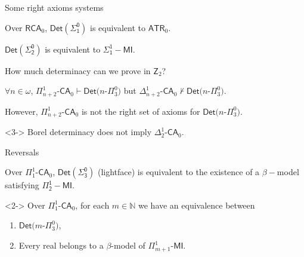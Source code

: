\documentclass{beamer} %
\begin{document}

\begin{frame}{Some right axioms systems}
    \begin{theorem}
        Over $\mathsf{RCA}_0$, $\mathsf{Det(\Sigma_1^0)}$ is equivalent to $\mathsf{ATR}_0$. 
    \end{theorem}

    \begin{theorem}[Tanaka]
        $\mathsf{Det(\Sigma_2^0)}$ is equivalent to $\mathsf{\Sigma_1^1-MI}$.
    \end{theorem}
\end{frame}


\begin{frame}{How much determinacy can we prove in $\mathsf{Z}_2$?} 
    \begin{theorem}
        $\forall n \in \omega$, $\Pi^1_{n+2}$-$\mathsf{CA}_0 \vdash \mathsf{Det}(n$-$\Pi^0_3)$ but
        $\Delta^1_{n+2}$-$\mathsf{CA}_0 \not\vdash \mathsf{Det}(n$-$\Pi^0_3)$.
    \end{theorem}
    \pause
    However, $\Pi^1_{n+2}$-$\mathsf{CA}_0$ is not the right set of axioms for 
    $\mathsf{Det}(n$-$\Pi^0_3)$.

    \begin{theorem}<3->
        Borel determinacy does not imply $\Delta^1_2$-$\mathsf{CA}_0$.
    \end{theorem}
\end{frame}


\begin{frame}{Reversals}
 
    \begin{theorem}[Hachtman]
        Over $\Pi_1^1$-$\mathsf{CA}_0$, $\mathsf{Det(\Sigma_3^0)}$ (lightface) is equivalent to the existence of a $\beta-$model 
        satisfying $\mathsf{\Pi_2^1-MI}$.
    \end{theorem}

    \begin{theorem}<2->
        Over $\Pi_1^1$-$\mathsf{CA}_0$, for each $m\in \mathbb{N}$ we have an 
        equivalence between 
        \begin{enumerate}
            \item $\mathsf{Det}(m$-$\Pi_3^0)$,
            \item Every real belongs to a $\beta$-model of $\Pi_{m+1}^1$-$\mathsf{MI}$.
        \end{enumerate}
    \end{theorem}
\end{frame}
\end{document}
